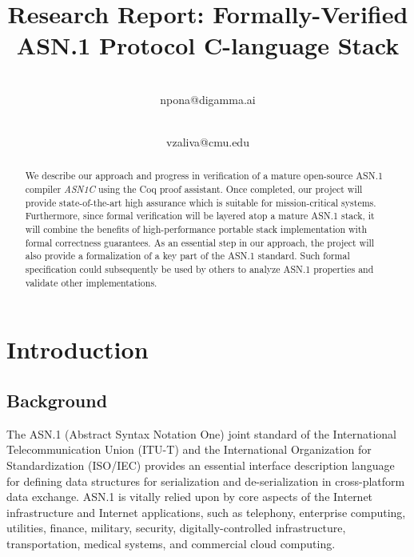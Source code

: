 \documentclass[10p,conference]{IEEEtran}
\begin{document}
\title{Research Report: Formally-Verified ASN.1 Protocol C-language Stack}

\author{
 \\ npona@digamma.ai
\and
{}
\\vzaliva@cmu.edu
}

\maketitle

\begin{abstract}

  We describe our approach and progress in verification of a
  mature open-source ASN.1 compiler \emph{ASN1C} using the Coq proof
  assistant. Once completed, our project will provide state-of-the-art
  high assurance which is suitable for mission-critical systems. Furthermore, since
  formal verification will be layered atop a mature ASN.1
  stack, it will combine the benefits of high-performance portable
  stack implementation with formal correctness guarantees. As an
  essential step in our
  approach, the project will also provide a formalization of a key part of
  the ASN.1 standard. Such formal specification could subsequently be
  used by others to analyze ASN.1 properties and validate other
  implementations.
\end{abstract}

\section{Introduction}

\subsection{Background}

The ASN.1 (Abstract Syntax
Notation One) \cite{ASN1Intro} joint standard of the International
Telecommunication Union (ITU-T) and the International Organization for
Standardization (ISO/IEC) provides an essential interface description
language for defining data structures for serialization and
de-serialization in cross-platform data exchange.
 ASN.1 is vitally relied upon by core aspects of the
Internet infrastructure and Internet applications, such as telephony,
enterprise computing, utilities, finance, military, security,
digitally-controlled infrastructure, transportation, medical systems,
and commercial cloud computing.
\end{document}
